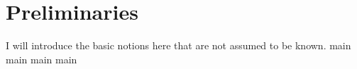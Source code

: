 \chapter{Preliminaries}
I will introduce the basic notions here that are not assumed to be known.
{main}
{main}
{main}
{main}
